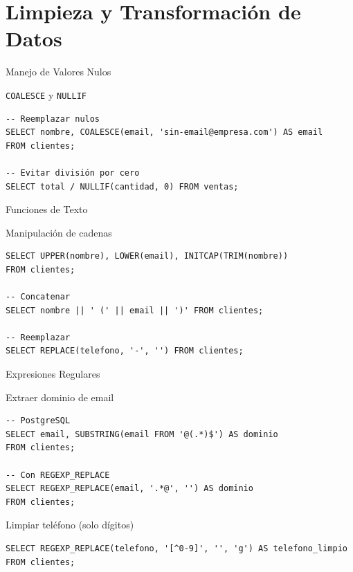 \documentclass[aspectratio=169, 10pt, xcolor=table]{beamer}
\begin{document}
\section{Limpieza y Transformación de Datos}

\begin{frame}[fragile]{Manejo de Valores Nulos}
    \begin{block}{\texttt{COALESCE} y \texttt{NULLIF}}
        \begin{lstlisting}
-- Reemplazar nulos
SELECT nombre, COALESCE(email, 'sin-email@empresa.com') AS email
FROM clientes;

-- Evitar división por cero
SELECT total / NULLIF(cantidad, 0) FROM ventas;
        \end{lstlisting}
    \end{block}
\end{frame}

\begin{frame}[fragile]{Funciones de Texto}
    \begin{block}{Manipulación de cadenas}
        \begin{lstlisting}
SELECT UPPER(nombre), LOWER(email), INITCAP(TRIM(nombre))
FROM clientes;

-- Concatenar
SELECT nombre || ' (' || email || ')' FROM clientes;

-- Reemplazar
SELECT REPLACE(telefono, '-', '') FROM clientes;
        \end{lstlisting}
    \end{block}
\end{frame}

\begin{frame}[fragile]{Expresiones Regulares}
    \begin{block}{Extraer dominio de email}
        \begin{lstlisting}
-- PostgreSQL
SELECT email, SUBSTRING(email FROM '@(.*)$') AS dominio
FROM clientes;

-- Con REGEXP_REPLACE
SELECT REGEXP_REPLACE(email, '.*@', '') AS dominio
FROM clientes;
        \end{lstlisting}
    \end{block}
    \begin{block}{Limpiar teléfono (solo dígitos)}
        \begin{lstlisting}
SELECT REGEXP_REPLACE(telefono, '[^0-9]', '', 'g') AS telefono_limpio
FROM clientes;
        \end{lstlisting}
    \end{block}
\end{frame}
\end{document}
